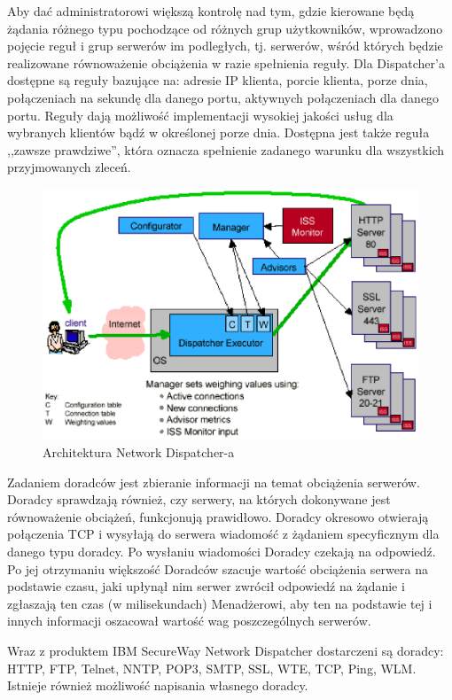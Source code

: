 Aby dać administratorowi większą kontrolę nad tym, gdzie kierowane będą żądania różnego typu pochodzące od różnych grup 
użytkowników, wprowadzono pojęcie reguł i grup serwerów im podległych, tj. serwerów, wśród których będzie realizowane 
równoważenie obciążenia w razie spełnienia reguły. Dla Dispatcher'a dostępne są reguły bazujące na: adresie IP klienta, porcie 
klienta, porze dnia, połączeniach na sekundę dla danego portu, aktywnych połączeniach dla danego portu. Reguły dają możliwość 
implementacji wysokiej jakości usług dla wybranych klientów bądź w określonej porze dnia. Dostępna jest także reguła ,,zawsze 
prawdziwe'', która oznacza spełnienie zadanego warunku dla wszystkich przyjmowanych zleceń.
\begin{figure}[h]
\centering
\includegraphics[width=5in]{./rysunki/executor.eps}
\caption{Architektura Network Dispatcher-a}
\label{dispatcher1}
\end{figure}

Zadaniem doradców jest zbieranie informacji na temat obciążenia serwerów. Doradcy sprawdzają również, czy serwery, na których 
dokonywane jest równoważenie obciążeń, funkcjonują prawidłowo. Doradcy okresowo otwierają połączenia TCP i wysyłają do serwera 
wiadomość z żądaniem specyficznym dla danego typu doradcy. Po wysłaniu wiadomości Doradcy czekają na odpowiedź. Po jej 
otrzymaniu większość Doradców szacuje wartość obciążenia serwera na podstawie czasu, jaki upłynął nim serwer zwrócił odpowiedź 
na żądanie i zgłaszają ten czas (w milisekundach) Menadżerowi, aby ten na podstawie tej i innych informacji oszacował wartość 
wag poszczególnych serwerów. 

Wraz z produktem IBM SecureWay Network Dispatcher dostarczeni są doradcy: HTTP, FTP, Telnet, NNTP, POP3, SMTP, SSL, WTE, TCP, 
Ping, WLM. Istnieje również możliwość napisania własnego doradcy. 

